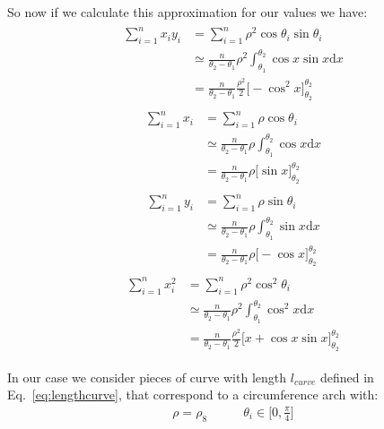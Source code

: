 \begin{itemize}
\begin{itemize}
So now if we calculate this approximation for our values we have:
\begin{align}
\begin{split}
\sum_{i=1}^{n}{x_iy_i} &= \sum_{i=1}^{n}{\rho^2\cos{\theta_i}\sin{\theta_i}}   \\
& \simeq  \frac{n}{\theta_2 - \theta_1}  \rho^2 \int_{\theta_1}^{\theta_2}{\cos{x}\sin{x} \mathrm  {d}x} \\
&=  \frac{n}{\theta_2 - \theta_1}  \frac{ \rho^2}{2} \Big[-\cos^2{x} \Big]_{\theta_2}^{\theta_2}
\end{split}
\label{eq:mandqintegralsoncircum1}
\end{align}
\begin{align}
\begin{split}
 \sum_{i=1}^{n}{x_i} &= \sum_{i=1}^{n}{\rho\cos{\theta_i}} \\
&\simeq  \frac{n}{\theta_2 - \theta_1}  \rho \int_{\theta_1}^{\theta_2}{\cos{x}\mathrm  {d}x} \\
&= \frac{n}{\theta_2 - \theta_1}  \rho \Big[\sin{x} \Big]_{\theta_2}^{\theta_2}
\end{split}
\label{eq:mandqintegralsoncircum2}
\end{align}
\begin{align}
\begin{split}
 \sum_{i=1}^{n}{y_i} &= \sum_{i=1}^{n}{\rho\sin{\theta_i}} \\
& \simeq  \frac{n}{\theta_2 - \theta_1}  \rho \int_{\theta_1}^{\theta_2}{\sin{x}\mathrm  {d}x} \\
&= \frac{n}{\theta_2 - \theta_1}  \rho \Big[-\cos{x} \Big]_{\theta_2}^{\theta_2}
\end{split}
\label{eq:mandqintegralsoncircum3}
\end{align}
\begin{align}
\begin{split}
 \sum_{i=1}^{n}{x_i^2} &= \sum_{i=1}^{n}{\rho^2\cos^2{\theta_i}} \\
& \simeq  \frac{n}{\theta_2 - \theta_1}  \rho^2 \int_{\theta_1}^{\theta_2}{\cos^2{x}\mathrm  {d}x} \\
&=  \frac{n}{\theta_2 - \theta_1}  \frac{ \rho^2}{2} \Big[ x+\cos{x} \sin{x}\Big]_{\theta_2}^{\theta_2}
\label{eq:mandqintegralsoncircum4}
\end{split}
\end{align}

In our case we consider pieces of curve with length $l_{curve}$ defined in Eq.~\ref{eq:lengthcurve}, that correspond to a circumference arch with:
\begin{align}
\rho = \rho_8  \ \ \ \ \ \ \ \ \ \ \ \ \ 
\theta_i \in \Big[0,\frac{\pi}{4}\Big]
\label{eq:valuessircum}
\end{align}


\end{itemize}
\end{itemize}
